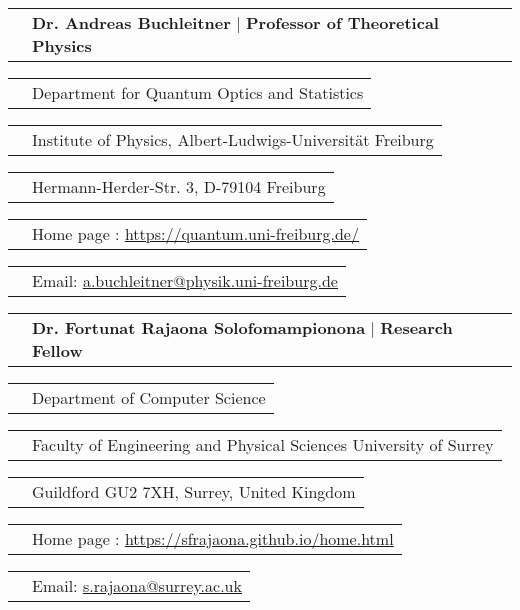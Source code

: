 \documentclass[11pt]{article}
\newcommand{\cvRefTitle}[2]{\begin{tabular}{>{\raggedleft\arraybackslash}p{3cm}>{\raggedright\arraybackslash}p{16cm}}
		 & \textbf{#1} $|$ \textbf{#2}  \\
\end{tabular}}
\newcommand{\cvRefEntry}[1]{\begin{tabular}{>{\raggedleft\arraybackslash}p{3cm}>{\raggedright\arraybackslash}p{16cm}}
		& #1 \\
\end{tabular}}
\begin{document}
\vspace*{15pt}
\cvRefTitle{Dr. Andreas Buchleitner}{Professor of Theoretical Physics}

\cvRefEntry{Department for Quantum Optics and Statistics}

\cvRefEntry{Institute of Physics, Albert-Ludwigs-Universität Freiburg}

\cvRefEntry{Hermann-Herder-Str. 3, D-79104 Freiburg}

\cvRefEntry{Home page : \href{https://quantum.uni-freiburg.de/}{\color{blue}\underline{https://quantum.uni-freiburg.de/}}}



\cvRefEntry{Email: \href{mailto:a.buchleitner@physik.uni-freiburg.de}{\color{blue}\underline{a.buchleitner@physik.uni-freiburg.de}}}

\vspace*{15pt}
\cvRefTitle{Dr. Fortunat Rajaona Solofomampionona}{Research Fellow}

\cvRefEntry{Department of Computer Science}

\cvRefEntry{Faculty of Engineering and Physical Sciences University of Surrey
}

\cvRefEntry{Guildford GU2 7XH, Surrey, United Kingdom}

\cvRefEntry{Home page : \href{https://sfrajaona.github.io/home.html}{\color{blue}\underline{https://sfrajaona.github.io/home.html}}}



\cvRefEntry{Email: \href{mailto:s.rajaona@surrey.ac.uk}{\color{blue}\underline{s.rajaona@surrey.ac.uk}}}
\end{document}
